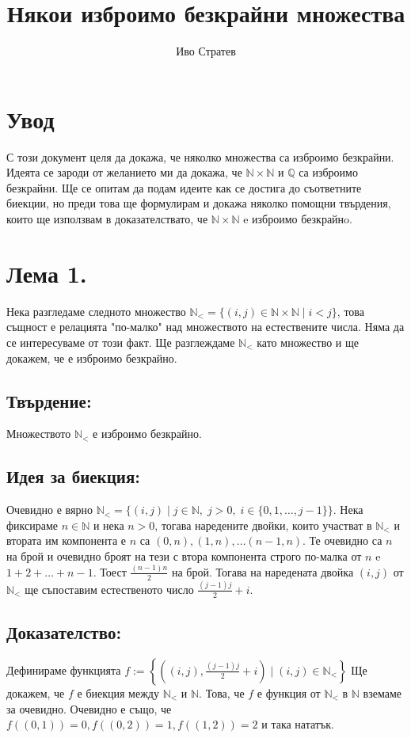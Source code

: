 \documentclass[a4paper, 12pt, oneside]{article}
\title{Някои изброимо безкрайни множества}
\author{Иво Стратев}
\newcommand{\N}{\mathbb{N}}
\newcommand{\Q}{\mathbb{Q}}
\newcommand{\LN}{\N_<}
\begin{document}
\maketitle
\section*{Увод}
С този документ целя да докажа, че няколко множества са изброимо безкрайни.
Идеята се зароди от желанието ми да докажа, че \(\N\times\N\) и \(\Q\) са изброимо безкрайни.
Ще се опитам да подам идеите как се достига до съответните биекции,
но преди това ще формулирам и докажа няколко помощни твърдения,
които ще използвам в доказателствато, че \(\N\times\N\) e изброимо безкрайнo.
\section*{Лема 1.}
Нека разгледаме следното множество \(\LN = \{(i, j) \in \N\times\N \; | \; i < j\}\),
това същност е релацията "по-малко" над множеството на естествените числа.
Няма да се интересуваме от този факт. Ще разглеждаме \(\LN\) като множество и ще докажем,
че е изброимо безкрайно.
\subsection*{Твърдение:}
Множеството \(\LN\) е изброимо безкрайно.
\subsection*{Идея за биекция:}
Очевидно е вярно \(\LN = \{(i, j) \; | \; j \in \N, \; j > 0, \; i \in \{0, 1, \dots, j - 1\}\}\).
Нека фиксираме \(n \in \N\) и нека \(n > 0\), тогава наредените двойки, които участват в \(\LN\)
и втората им компонента е \(n\) са \((0, n), (1, n), \dots (n - 1, n)\).
Те очевидно са \(n\) на брой и очевидно броят на тези с втора компонента строго по-малка от \(n\)
e \(1 + 2 + \dots + n - 1\). Тоест \(\displaystyle\frac{(n - 1)n}{2}\) на брой.
Тогава на наредената двойка \((i, j)\) от \(\LN\) ще съпоставим естественото число \(\displaystyle\frac{(j - 1)j}{2} + i\). \\
\subsection*{Доказателство:}
Дефинираме функцията \(f := \left\{\left((i, j), \displaystyle\frac{(j - 1)j}{2} + i\right) \; \Big| \; (i, j) \in \LN \right\}\)
Ще докажем, че \(f\) е биекция между \(\LN\) и \(\N\). Това, че \(f\) е функция от \(\LN\) в \(\N\) вземаме за очевидно.
Очевидно е също, че \(f((0, 1)) = 0, f((0, 2)) = 1, f((1, 2)) = 2\) и така нататък.
\end{document}
